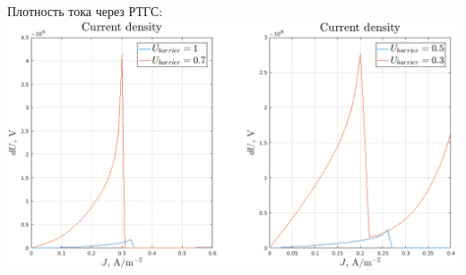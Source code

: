 \documentclass[10pt,pdf,hyperref={unicode},aspectratio={169}]{beamer}
\begin{document}
\begin{frame}
\begin{columns}
		{\color{red} Плотность тока через РТГС:}\\
	   	\includegraphics[width=.88\linewidth,center]{assets/qwj}
	\end{columns}
\end{frame}
\end{document}
